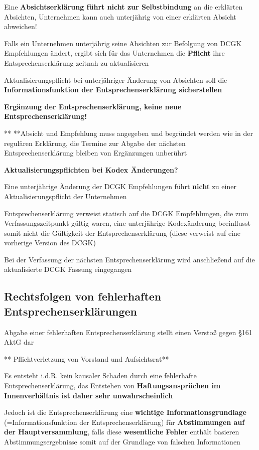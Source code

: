 \documentclass[
]{article}
\begin{document}
Eine \textbf{Absichtserklärung führt nicht zur Selbstbindung} an die
erklärten Absichten, Unternehmen kann auch unterjährig von einer
erklärten Absicht abweichen!

Falls ein Unternehmen unterjährig seine Absichten zur Befolgung von DCGK
Empfehlungen ändert, ergibt sich für das Unternehmen die
\textbf{Pflicht} ihre Entsprechenserklärung zeitnah zu aktualisieren

Aktualisierungspflicht bei unterjähriger Änderung von Absichten soll die
\textbf{Informationsfunktion der Entsprechenserklärung sicherstellen}

\textbf{Ergänzung der Entsprechenserklärung, keine neue
Entsprechenserklärung!}

** **Absicht und Empfehlung muss angegeben und begründet werden wie in
der regulären Erklärung, die Termine zur Abgabe der nächsten
Entsprechenserklärung bleiben von Ergänzungen unberührt

\textbf{Aktualisierungspflichten bei Kodex Änderungen?}

Eine unterjährige Änderung der DCGK Empfehlungen führt \textbf{nicht} zu
einer Aktualisierungspflicht der Unternehmen

Entsprechenserklärung verweist statisch auf die DCGK Empfehlungen, die
zum Verfassungszeitpunkt gültig waren, eine unterjährige Kodexänderung
beeinflusst somit nicht die Gültigkeit der Entsprechenserklärung (diese
verweist auf eine vorherige Version des DCGK)

Bei der Verfassung der nächsten Entsprechenserklärung wird anschließend
auf die aktualisierte DCGK Fassung eingegangen

\hypertarget{rechtsfolgen-von-fehlerhaften-entsprechenserkluxe4rungen}{%
\subsection{Rechtsfolgen von fehlerhaften
Entsprechenserklärungen}\label{rechtsfolgen-von-fehlerhaften-entsprechenserkluxe4rungen}}

Abgabe einer fehlerhaften Entsprechenserklärung stellt einen Verstoß
gegen §161 AktG dar

** Pflichtverletzung von Vorstand und Aufsichtsrat**

Es entsteht i.d.R. kein kausaler Schaden durch eine fehlerhafte
Entsprechenserklärung, das Entstehen von \textbf{Haftungsansprüchen im
Innenverhältnis ist daher sehr unwahrscheinlich}

Jedoch ist die Entsprechenserklärung eine \textbf{wichtige
Informationsgrundlage} (=Informationsfunktion der Entsprechenserklärung)
für \textbf{Abstimmungen auf der Hauptversammlung}, falls diese
\textbf{wesentliche} \textbf{Fehler} enthält basieren
Abstimmungsergebnisse somit auf der Grundlage von falschen Informationen
\end{document}
